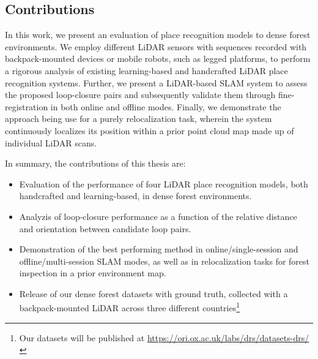 \subsection*{Contributions}

In this work, we present an evaluation of place recognition models to dense forest environments. We employ different LiDAR sensors with sequences recorded with backpack-mounted devices or mobile robots, such as legged platforms, to perform a rigorous analysis of existing learning-based and handcrafted LiDAR place recognition systems. Further, we present a LiDAR-based SLAM system to assess the proposed loop-closure pairs and subsequently validate them through fine-registration in both online and offline modes. Finally, we demonstrate the approach being use for a purely relocalization task, wherein the system continuously localizes its position within a prior point cloud map made up of individual LiDAR scans.



In summary, the contributions of this thesis are:
\begin{itemize}

\item Evaluation of the performance of four LiDAR place recognition models, both handcrafted and learning-based, in dense forest environments.

\item Analyzis of loop-closure performance as a function of the relative distance and orientation between candidate loop pairs.

\item Demonstration of the best performing method in online/single-session and offline/multi-session SLAM modes, as well as in relocalization tasks for forest inspection in a prior environment map. 

\item Release of our dense forest datasets with ground truth, collected with a backpack-mounted LiDAR across three different countries\footnote{Our datasets will be published at \url{https://ori.ox.ac.uk/labs/drs/datasets-drs/}} 
\end{itemize}






